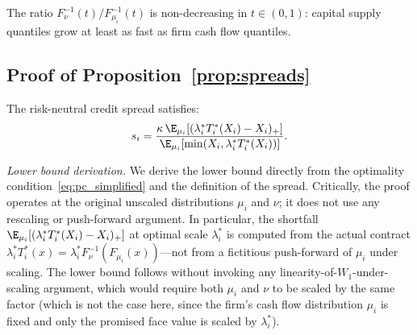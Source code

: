 \begin{assumption}
\label{ass:heavy_tails}
The ratio $F_\nu^{-1}(t)/F_{\mu_i}^{-1}(t)$ is non-decreasing in $t \in (0,1)$: capital supply quantiles grow at least as fast as firm cash flow quantiles.
\end{assumption}

\subsection*{Proof of Proposition~\ref{prop:spreads}}

The risk-neutral credit spread satisfies:
\[
  s_i = \frac{\kappa\,\E_{\mu_i}[(\lambda_i^* T_i^*(X_i)-X_i)_+]}{\E_{\mu_i}[\min(X_i, \lambda_i^* T_i^*(X_i))]}.
\]

\emph{Lower bound derivation.} We derive the lower bound directly from the optimality condition~\eqref{eq:pc_simplified} and the definition of the spread. Critically, the proof operates at the original unscaled distributions $\mu_i$ and $\nu$; it does not use any rescaling or push-forward argument. In particular, the shortfall $\E_{\mu_i}[(\lambda_i^* T_i^*(X_i)-X_i)_+]$ at optimal scale $\lambda_i^*$ is computed from the actual contract $\lambda_i^* T_i^*(x) = \lambda_i^* F_\nu^{-1}(F_{\mu_i}(x))$---not from a fictitious push-forward of $\mu_i$ under scaling. The lower bound follows without invoking any linearity-of-$W_1$-under-scaling argument, which would require both $\mu_i$ and $\nu$ to be scaled by the same factor (which is not the case here, since the firm's cash flow distribution $\mu_i$ is fixed and only the promised face value is scaled by $\lambda_i^*$).

